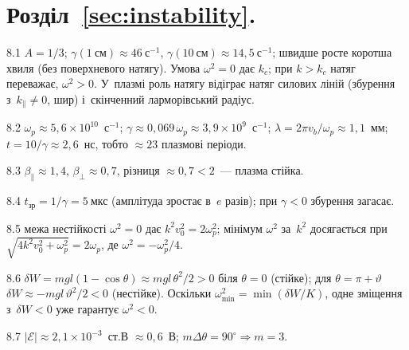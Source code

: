 \protect \section *{Розділ~\ref *{sec:instability}. }
\begin{Solution}{8.{1}}
		$A=1/3$; $\gamma(1~\text{см})\approx46~\mathrm{с}^{-1}$, $\gamma(10~\text{см})\approx14{,}5~\mathrm{с}^{-1}$; швидше росте коротша хвиля (без поверхневого натягу). Умова $\omega^2=0$ дає $k_c$; при $k>k_c$ натяг переважає, $\omega^2>0$. У~плазмі роль натягу відіграє натяг силових ліній (збурення з~$k_\parallel\ne0$, шир) і~скінченний ларморівський радіус.
	
\end{Solution}
\begin{Solution}{8.{2}}
		$\omega_p\approx5{,}6\times10^{10}$~с$^{-1}$; $\gamma\approx0{,}069\,\omega_p\approx3{,}9\times10^{9}$~с$^{-1}$;
$\lambda=2\pi v_b/\omega_p\approx1{,}1$~мм; $t=10/\gamma\approx2{,}6$~нс, тобто $\approx23$ плазмові періоди.
	
\end{Solution}
\begin{Solution}{8.{3}}
		$\beta_\parallel\approx1{,}4$, $\beta_\perp\approx0{,}7$, різниця $\approx0{,}7<2$~--- плазма стійка.
	
\end{Solution}
\begin{Solution}{8.{4}}
		$t_{\text{зр}}=1/\gamma=5~\text{мкс}$ (амплітуда зростає в~$e$ разів); при $\gamma<0$ збурення загасає.
	
\end{Solution}
\begin{Solution}{8.{5}}
		межа нестійкості $\omega^2=0$ дає $k^2v_0^2=2\omega_p^2$; мінімум $\omega^2$ за~$k^2$ досягається при
$\sqrt{4k^2v_0^2+\omega_p^2}=2\omega_p$, де $\omega^2=-\omega_p^2/4$.
	
\end{Solution}
\begin{Solution}{8.{6}}
		$\delta W=mgl(1-\cos\theta)\approx mgl\,\theta^2/2>0$ біля $\theta=0$ (стійке); для $\theta=\pi+\vartheta$
$\delta W\approx-mgl\,\vartheta^2/2<0$ (нестійке). Оскільки $\omega^2_{\min}=\min(\delta W/K)$, одне зміщення з~$\delta W<0$ уже гарантує $\omega^2<0$.
	
\end{Solution}
\begin{Solution}{8.{7}}
		$|\mathcal E|\approx2{,}1\times10^{-3}$~ст.В $\approx0{,}6$~В; $m\Delta\theta=90^\circ\Rightarrow m=3$.
	
\end{Solution}
